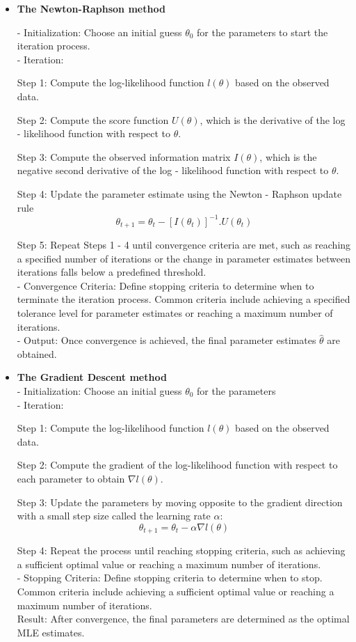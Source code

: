 \documentclass[12pt]{article}
\begin{document}
	
	\begin{itemize}
		\item \textbf{The Newton-Raphson method}
		
		- Initialization: Choose an initial guess $\theta_{0}$ for the parameters to start the iteration process.
		\\
		- Iteration:
		
		Step 1: Compute the log-likelihood function $l(\theta)$ based on the observed data.
		
		Step 2: Compute the score function $U(\theta)$, which is the derivative of the log - likelihood function with respect to $\theta$.
		
		Step 3: Compute the observed information matrix $I(\theta)$, which is the negative second derivative of the log - likelihood function with respect to 
		$\theta$.
		
		Step 4: Update the parameter estimate using the Newton - Raphson update rule $$\theta_{t+1} = \theta_{t} - [I(\theta_{t})]^{-1}.U(\theta_{t})$$
		
	 	Step 5: Repeat Steps 1 - 4 until convergence criteria are met, such as reaching a specified number of iterations or the change in parameter estimates between iterations falls below a predefined threshold.
	 	\\
	 	- Convergence Criteria: Define stopping criteria to determine when to terminate the iteration process. Common criteria include achieving a specified tolerance level for parameter estimates or reaching a maximum number of iterations.
	 	\\
	 	- Output: Once convergence is achieved, the final parameter estimates $\hat{\theta}$ are obtained.
		\\
		
		\item \textbf{The Gradient Descent method}
		\\
		
		- Initialization: Choose an initial guess $\theta_{0}$ for the parameters
		\\
		- Iteration:
		
		Step 1: Compute the log-likelihood function $l(\theta)$ based on the observed data.
		
		Step 2: Compute the gradient of the log-likelihood function with respect to each parameter to obtain $\nabla l(\theta)$. 
		
		Step 3: Update the parameters by moving opposite to the gradient direction with a small step size called the learning rate $\alpha$:
		$$\theta_{t+1} = \theta_{t} - \alpha \nabla l(\theta) $$
		
		Step 4: Repeat the process until reaching stopping criteria, such as achieving a sufficient optimal value or reaching a maximum number of iterations.
		\\
		- Stopping Criteria: Define stopping criteria to determine when to stop. Common criteria include achieving a sufficient optimal value or reaching a maximum number of iterations.
		\\
		Result: After convergence, the final parameters are determined as the optimal MLE estimates. 
				
	\end{itemize}
\end{document}

